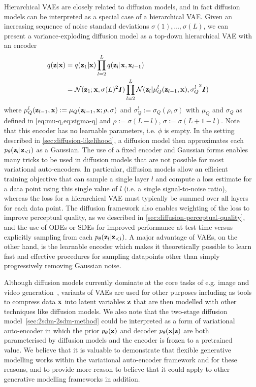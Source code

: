 Hierarchical VAEs are closely related to diffusion models, and in fact diffusion models can be interpreted as a special case of a hierarchical VAE. Given an increasing sequence of noise standard deviations $\sigma(1),\ldots,\sigma(L)$, we can present a variance-exploding diffusion model as a top-down hierarchical VAE with an encoder
\begin{align}
    q({\mathbf{z}}|{\mathbf{x}}) &= q({\mathbf{z}}_1|{\mathbf{x}}) \prod_{l=2}^L q({\mathbf{z}}_l | {\mathbf{x}}, {\mathbf{x}}_{l-1}) \\
    &= {\mathcal{N}}( {\mathbf{z}}_1 ; {\mathbf{x}}, \sigma(L)^2 {\bm{I}} ) \prod_{l=2}^L {\mathcal{N}}( {\mathbf{z}}_l | \mu^l_Q({\mathbf{z}}_{l-1}, {\mathbf{x}}), {\sigma_Q^l}^2 {\bm{I}} )
\end{align}
where $\mu^l_Q({\mathbf{z}}_{l-1}, {\mathbf{x}}) := \mu_Q({\mathbf{z}}_{l-1}, {\mathbf{x}}; \rho, \sigma)$ and $\sigma^l_Q := \sigma_Q(\rho, \sigma)$ with $\mu_Q$ and $\sigma_Q$ as defined in \cref{eq:mu-q,eq:sigma-q} and $\rho := \sigma(L-l)$, $\sigma := \sigma(L+1-l)$. Note that this encoder has no learnable parameters, i.e. $\phi$ is empty. In the setting described in \cref{sec:diffusion-likelihood}, a diffusion model then approximates each $p_\theta({\mathbf{z}}_l|{\mathbf{z}}_{<l})$ as a Gaussian. The use of a fixed encoder and Gaussian forms enables many tricks to be used in diffusion models that are not possible for most variational auto-encoders. In particular, diffusion models allow an efficient training objective that can sample a single layer $l$ and compute a loss estimate for a data point using this single value of $l$ (i.e. a single signal-to-noise ratio), whereas the loss for a hierarchical VAE must typically be summed over all layers for each data point. The diffusion framework also enables weighting of the loss to improve perceptual quality, as we described in \cref{sec:diffusion-perceptual-quality}, and the use of ODEs or SDEs for improved performance at test-time versus explicitly sampling from each $p_\theta({\mathbf{z}}_l|{\mathbf{z}}_{<l})$.
A major advantage of VAEs, on the other hand, is the learnable encoder which makes it theoretically possible to learn fast and effective procedures for sampling datapoints other than simply progressively removing Gaussian noise. 

Although diffusion models currently dominate at the core tasks of e.g. image and video generation~\citep{esser2024scaling,brooks2024video}, variants of VAEs are used for other purposes including as tools to compress data ${\mathbf{x}}$ into latent variables ${\mathbf{z}}$ that are then modelled with other techniques like diffusion models. We also note that the two-stage diffusion model~\cref{sec:2sdm-2sdm-method} could be interpreted as a form of variational auto-encoder in which the prior $p_\theta({\mathbf{z}})$ and decoder $p_\theta({\mathbf{x}}|{\mathbf{z}})$ are both parameterised by diffusion models and the encoder is frozen to a pretrained value. We believe that it is valuable to demonstrate that flexible generative modelling works within the variational auto-encoder framework and for these reasons, and to provide more reason to believe that it could apply to other generative modelling frameworks in addition.

